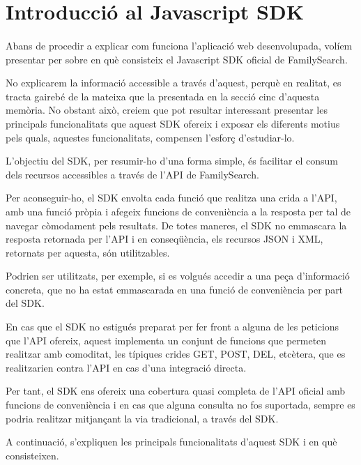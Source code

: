 \section{Introducció al Javascript SDK}

    \paragraph{}
    Abans de procedir a explicar com funciona l'aplicació web desenvolupada, volíem presentar per sobre en què consisteix el Javascript SDK oficial de FamilySearch.

    No explicarem la informació accessible a través d'aquest, perquè en realitat, es tracta gairebé de la mateixa que la presentada en la secció cinc d'aquesta memòria. No obstant això, creiem que pot resultar interessant presentar les principals funcionalitats que aquest SDK ofereix i exposar els diferents motius pels quals, aquestes funcionalitats, compensen l’esforç d’estudiar-lo.

    L’objectiu del SDK, per resumir-ho d’una forma simple, és facilitar el consum dels recursos accessibles a través de l'API de FamilySearch.

    Per aconseguir-ho, el SDK envolta cada funció que realitza una crida a l’API, amb una funció pròpia i afegeix funcions de conveniència a la resposta per tal de navegar còmodament pels resultats. De totes maneres, el SDK no emmascara la resposta retornada per l’API i en conseqüència, els recursos JSON i XML, retornats per aquesta, són utilitzables.

    Podrien ser utilitzats, per exemple, si es volgués accedir a una peça d'informació concreta, que no ha estat emmascarada en una funció de conveniència per part del SDK.

    En cas que el SDK no estigués preparat per fer front a alguna de les peticions que l’API ofereix, aquest implementa un conjunt de funcions que permeten realitzar amb comoditat, les típiques crides GET, POST, DEL, etcètera, que es realitzarien contra l’API en cas d’una integració directa.

    Per tant, el SDK ens ofereix una cobertura quasi completa de l’API oficial amb funcions de conveniència i en cas que alguna consulta no fos suportada, sempre es podria realitzar mitjançant la via tradicional, a través del SDK.

    A continuació, s'expliquen les principals funcionalitats d'aquest SDK i en què consisteixen.
